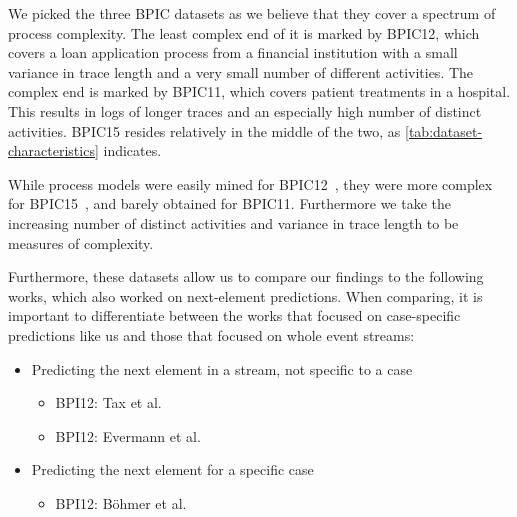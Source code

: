 We picked the three BPIC datasets as we believe that they cover a spectrum of process complexity. The least complex end of it is marked by BPIC12, which covers a loan application process from a financial institution with a small variance in trace length and a very small number of different activities. The complex end is marked by BPIC11, which covers patient treatments in a hospital. This results in logs of longer traces and an especially high number of distinct activities. BPIC15 resides relatively in the middle of the two, as \autoref{tab:dataset-characteristics} indicates.

While process models were easily mined for BPIC12~\cite{adriansyah2012mining}, they were more complex for BPIC15~\cite{van2015benchmarking}, and barely obtained for BPIC11. Furthermore we take the increasing number of distinct activities and variance in trace length to be measures of complexity.

Furthermore, these datasets allow us to compare our findings to the following works, which also worked on next-element predictions. When comparing, it is important to differentiate between the works that focused on case-specific predictions like us and those that focused on whole event streams:

\begin{itemize}
    \item Predicting the next element in a stream, not specific to a case
    \begin{itemize}
        \item BPI12: Tax et al.~\cite{tax2018interdisciplinary, tax2017}
        \item BPI12: Evermann et al.~\cite{evermann2016}
    \end{itemize}
    \item Predicting the next element for a specific case
    \begin{itemize}
        \item BPI12: Böhmer et al.~\cite{boehmer2018probability}
    \end{itemize}
\end{itemize}

